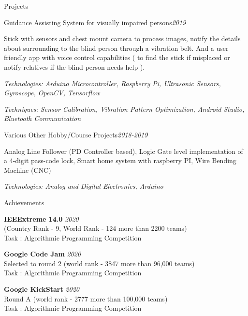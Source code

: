 \documentclass{resume} %
\begin{document}
\begin{rSection}{Projects}


\begin{rSubsection}{Guidance Assisting System for visually impaired persons}{\em {2019}}{}{}
\item Stick with sensors and chest mount camera to process images, notify the details about surrounding to the blind person through a vibration belt. And a user friendly app with voice control capabilities ( to find the stick if misplaced or notify relatives if the blind person needs help ). 
\item \textit{Technologies: Arduino Microcontroller, Raspberry Pi, Ultrasonic Sensors, Gyroscope, OpenCV, Tensorflow} 
\item \textit{Techniques: Sensor Calibration, Vibration Pattern Optimization, Android Studio, Bluetooth Communication}
\end{rSubsection}

\begin{rSubsection}{Various Other Hobby/Course Projects}{\em {2018-2019}}{}{}
\item Analog Line Follower (PD Controller based), Logic Gate level implementation of a 4-digit pass-code lock, Smart home system with raspberry PI, Wire Bending Machine (CNC)
\item \textit{Technologies: Analog and Digital Electronics, Arduino}
\end{rSubsection}


\begin{rSection}{Achievements}

{\bf IEEExtreme 14.0} \hfill {\em 2020}
\\ (Country Rank - 9, World Rank - 124 more than 2200 teams)
\\Task : Algorithmic Programming Competition


{\bf Google Code Jam} \hfill {\em 2020}
\\Selected to round 2 (world rank - 3847 more than 96,000 teams)
\\Task : Algorithmic Programming Competition

{\bf Google KickStart} \hfill {\em 2020}
\\Round A (world rank - 2777 more than 100,000 teams)
\\Task : Algorithmic Programming Competition


\end{rSection}
\end{rSection}
\end{document}
